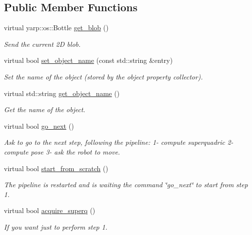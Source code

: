 \subsection*{Public Member Functions}
\begin{DoxyCompactItemize}
\item 
virtual yarp\-::os\-::\-Bottle \hyperlink{classexperimentOne__IDL_a4e631c4039aa9e4685f7d75f778145a2}{get\-\_\-blob} ()
\begin{DoxyCompactList}\small\item\em Send the current 2\-D blob. \end{DoxyCompactList}\item 
virtual bool \hyperlink{classexperimentOne__IDL_a3ba4eae42268c1dec8c90a971ffde7af}{set\-\_\-object\-\_\-name} (const std\-::string \&entry)
\begin{DoxyCompactList}\small\item\em Set the name of the object (stored by the object property collector). \end{DoxyCompactList}\item 
virtual std\-::string \hyperlink{classexperimentOne__IDL_af9d945019f95b6f806a20615e56b7c4b}{get\-\_\-object\-\_\-name} ()
\begin{DoxyCompactList}\small\item\em Get the name of the object. \end{DoxyCompactList}\item 
virtual bool \hyperlink{classexperimentOne__IDL_ab628b9a3d8ada84e07aaadf891a7ccd0}{go\-\_\-next} ()
\begin{DoxyCompactList}\small\item\em Ask to go to the next step, following the pipeline\-: 1-\/ compute superquadric 2-\/ compute pose 3-\/ ask the robot to move. \end{DoxyCompactList}\item 
virtual bool \hyperlink{classexperimentOne__IDL_a3d5c2f8f904ef29753934d10df4717a4}{start\-\_\-from\-\_\-scratch} ()
\begin{DoxyCompactList}\small\item\em The pipeline is restarted and is waiting the command \char`\"{}go\-\_\-next\char`\"{} to start from step 1. \end{DoxyCompactList}\item 
virtual bool \hyperlink{classexperimentOne__IDL_a30aa180a17e099d11a6c0588dc96eed1}{acquire\-\_\-superq} ()
\begin{DoxyCompactList}\small\item\em If you want just to perform step 1. \end{DoxyCompactList}\item 

\end{DoxyCompactItemize}

